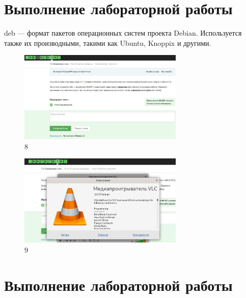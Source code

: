 \hypertarget{ux432ux44bux43fux43eux43bux43dux435ux43dux438ux435-ux43bux430ux431ux43eux440ux430ux442ux43eux440ux43dux43eux439-ux440ux430ux431ux43eux442ux44b-6}{%
\section{Выполнение лабораторной
работы}\label{ux432ux44bux43fux43eux43bux43dux435ux43dux438ux435-ux43bux430ux431ux43eux440ux430ux442ux43eux440ux43dux43eux439-ux440ux430ux431ux43eux442ux44b-6}}

deb --- формат пакетов операционных систем проекта Debian. Используется
также их производными, такими как Ubuntu, Knoppix и другими.

\begin{figure}
\hypertarget{fig:008}{%
\centering
\includegraphics[width=0.7\textwidth,height=\textheight]{image/8.png}
\caption{8}\label{fig:008}
}
\end{figure}

\begin{figure}
\hypertarget{fig:009}{%
\centering
\includegraphics[width=0.7\textwidth,height=\textheight]{image/9.png}
\caption{9}\label{fig:009}
}
\end{figure}

\hypertarget{ux432ux44bux43fux43eux43bux43dux435ux43dux438ux435-ux43bux430ux431ux43eux440ux430ux442ux43eux440ux43dux43eux439-ux440ux430ux431ux43eux442ux44b-7}{%
\section{Выполнение лабораторной
работы}\label{ux432ux44bux43fux43eux43bux43dux435ux43dux438ux435-ux43bux430ux431ux43eux440ux430ux442ux43eux440ux43dux43eux439-ux440ux430ux431ux43eux442ux44b-7}}

